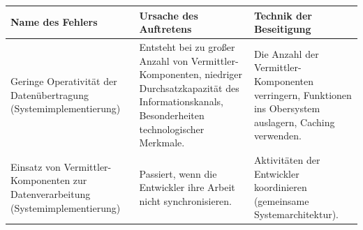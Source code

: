 \documentclass[11pt,a4paper]{article}
\begin{document}
\begin{center}\small
  \begin{tabular}{|p{}|p{}|p{}|}\hline 
    Name des Fehlers & Ursache des Auftretens & Technik der
    Beseitigung\\\hline

    Geringe Operativität der Datenübertragung (Systemimplementierung) &
    
    Entsteht bei zu großer Anzahl von Vermittler-Komponenten,
    niedriger Durchsatzkapazität des Informationskanals,
    Besonderheiten technologischer Merkmale. &
    
    Die Anzahl der Vermittler-Komponenten verringern, Funktionen ins
    Obersystem auslagern, Caching verwenden.\\\hline
    
    Einsatz von Vermittler-Komponenten zur Datenverarbeitung
    (Systemimplementierung) & 
    
    Passiert, wenn die Entwickler ihre Arbeit nicht synchronisieren.&

    Aktivitäten der Entwickler koordinieren (gemeinsame
    Systemarchitektur).\\\hline 
  \end{tabular}
\end{center}
\end{document}
